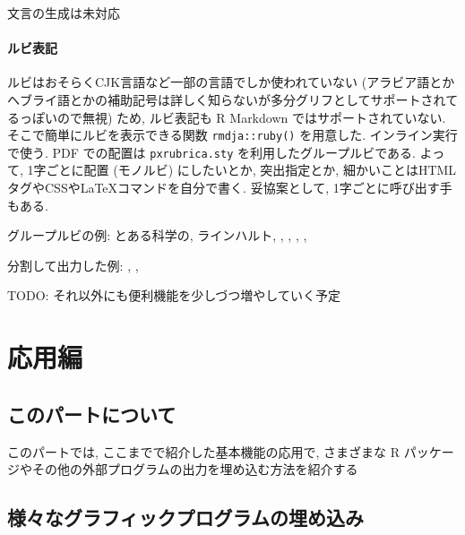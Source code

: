 \documentclass[
  xelatex,ja=standard,jafont=noto]{bxjsbook}
\theoremstyle{definition}
\theoremstyle{definition}
\theoremstyle{definition}
\theoremstyle{definition}
\theoremstyle{remark}
\begin{document}
文言の生成は未対応

\hypertarget{ux30ebux30d3ux8868ux8a18}{%
\subsection{ルビ表記}\label{ux30ebux30d3ux8868ux8a18}}

ルビはおそらくCJK言語など一部の言語でしか使われていない
(アラビア語とかヘブライ語とかの補助記号は詳しく知らないが多分グリフとしてサポートされてるっぽいので無視)
ため, ルビ表記も R Markdown ではサポートされていない.
そこで簡単にルビを表示できる関数 \texttt{rmdja::ruby()} を用意した.
インライン実行で使う. PDF での配置は \texttt{pxrubrica.sty}
を利用したグループルビである. よって, 1字ごとに配置 (モノルビ)
にしたいとか, 突出指定とか,
細かいことはHTMLタグやCSSやLaTeXコマンドを自分で書く. 妥協案として,
1字ごとに呼び出す手もある.

グループルビの例: とある科学の,
ラインハルト,
,
,
, , 

分割して出力した例:
,
 ,

TODO: それ以外にも便利機能を少しづつ増やしていく予定

\hypertarget{part-ux5fdcux7528ux7de8}{%
\part{応用編}\label{part-ux5fdcux7528ux7de8}}

\hypertarget{ux3053ux306eux30d1ux30fcux30c8ux306bux3064ux3044ux3066}{%
\chapter*{このパートについて}\label{ux3053ux306eux30d1ux30fcux30c8ux306bux3064ux3044ux3066}}

このパートでは, ここまでで紹介した基本機能の応用で, さまざまな R
パッケージやその他の外部プログラムの出力を埋め込む方法を紹介する

\hypertarget{advanced-graph}{%
\chapter{様々なグラフィックプログラムの埋め込み}\label{advanced-graph}}
\end{document}
